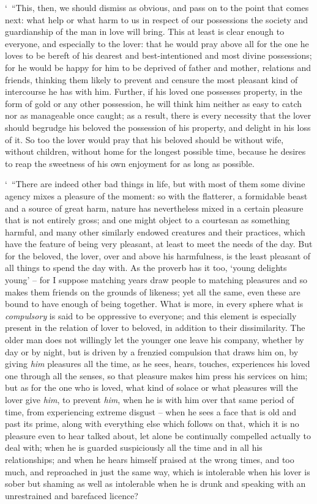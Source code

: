 ‘~“This, then, we should dismiss as obvious, and pass on to  the
point that comes next: what help or what harm to us in respect of our
possessions the society and guardianship of the man in love will bring.
This at least is clear enough to everyone, and especially to the lover:
that he would pray above all for the  one he loves to be bereft
of his dearest and best-intentioned and most divine possessions; for he
would be happy for him to be  deprived of father and mother,
relations and friends, thinking them likely to prevent and censure the
most pleasant kind of intercourse he has with him. Further, if his loved
one possesses property, in the form of gold or any other possession, he
will think him neither as easy to catch nor as manageable once caught;
as a result, there is every necessity that the lover should 
begrudge his beloved the possession of his property, and delight in his
loss of it. So too the lover would pray that his beloved should be
without wife, without children, without home for the longest possible
time, because he desires to reap the sweetness of his own enjoyment for
as long as possible.

‘~“There are indeed other bad things in life, but with most of them
 some divine agency mixes a pleasure of the moment: so with the
flatterer, a formidable beast and a source of great harm, nature has
nevertheless mixed in a certain pleasure that is not entirely gross; and
one might object to a courtesan as something harmful, and many other
similarly endowed creatures  and their practices, which have the
feature of being very pleasant, at least to meet the needs of the day.
But for the beloved, the lover, over and above his harmfulness, is the
least  pleasant of all things to spend the day with. As the
proverb has it too, ‘young delights young' -- for I suppose matching
years draw people to matching pleasures and so makes them friends on the
grounds of likeness; yet all the same, even these are bound to have
enough of being together. What is more, in every sphere what is
{\em compulsory} is said to be oppressive to everyone;  and this
element is especially present in the relation of lover to beloved, in
addition to their dissimilarity. The older man does not willingly let
the younger one leave his company, whether by day or by night, but is
driven by a frenzied compulsion that  draws him on, by giving
{\em him} pleasures all the time, as he sees, hears, touches,
experiences his loved one through all the senses, so that pleasure makes
him press his services on him; but as for the one who is loved, what
kind of solace or what pleasures  will the lover give {\em him},
to prevent {\em him}, when he is with him over that same period of time,
from experiencing extreme disgust -- when he sees a face that is old and
past its prime, along with everything else which follows on that, which
it is no pleasure  even to hear talked about, let alone be
continually compelled actually to deal with; when he is guarded
suspiciously all the time and in all his relationships; and when he
hears himself praised at the wrong times, and too much, and reproached
in just the same way, which is intolerable when his lover is sober but
 shaming as well as intolerable when he is drunk and speaking
with an unrestrained and barefaced licence?

